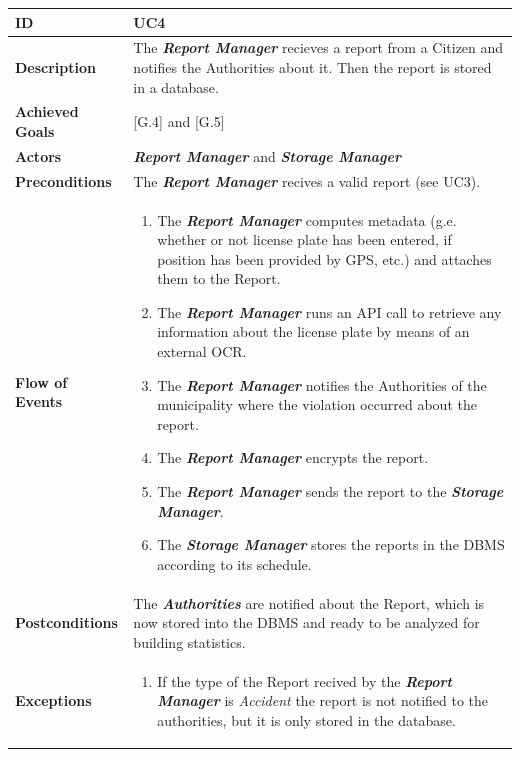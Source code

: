 \documentclass{report}
\begin{document}
\begin{tabularx}{\linewidth}{| l | X |}
	\hline
	\textbf{ID} & UC4\\
	
	\hline
	\textbf{Description} & The \textbf{\textit{Report Manager}} recieves a report from a Citizen and notifies the Authorities about it. Then the report is stored in a database.\\
	
	\hline
	\textbf{Achieved Goals} & {[G.4]} and {[G.5]}\\

	\hline
	\textbf{Actors} & \textbf{\textit{Report Manager}} and \textbf{\textit{Storage Manager}}\\
	
	\hline
	\textbf{Preconditions} & The \textbf{\textit{Report Manager}} recives a valid report (see UC3).\\
	
	\hline
	\textbf{Flow of Events} & \parbox{0.7\textwidth}{\begin{enumerate}
			\item The \textbf{\textit{Report Manager}} computes metadata (g.e. whether or not license plate has been entered, if position has been provided by GPS, etc.) and attaches them to the Report.
			\item The \textbf{\textit{Report Manager}} runs an API call to retrieve any information about the license plate by means of an external OCR.
			\item The \textbf{\textit{Report Manager}} notifies the Authorities of the municipality where the violation occurred about the report.
			\item The \textbf{\textit{Report Manager}} encrypts the report.	
			\item The \textbf{\textit{Report Manager}} sends the report to the \textbf{\textit{Storage Manager}}.
			\item The \textbf{\textit{Storage Manager}} stores the reports in the DBMS according to its schedule.
			
	\end{enumerate}}\\
	
	\hline
	\textbf{Postconditions} & The \textbf{\textit{Authorities}} are notified about the Report, which is now stored into the DBMS and ready to be analyzed for building statistics.\\
	
	\hline
	\textbf{Exceptions} & \parbox{0.7\textwidth}{ \begin{enumerate}
			\item If the type of the Report recived by the \textbf{\textit{Report Manager}} is \textit{Accident} the report is not notified to the authorities, but it is only stored in the database. 
		\end{enumerate}}\\
	
	\hline
	
\end{tabularx}
\end{document}
